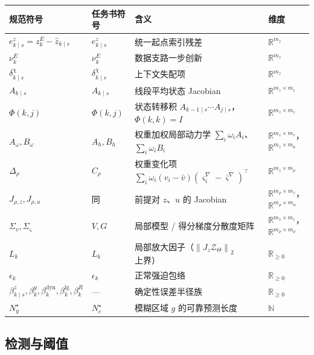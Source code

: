 \documentclass[11pt,a4paper]{ctexart}
\theoremstyle{remark}
\newcommand{\R}{\mathbb{R}}
\newcommand{\norm}[1]{\left\|#1\right\|}
\newcommand{\ZT}{\mathcal{Z}_{\Theta}}
\begin{document}
\begin{longtable}{L{0.28\textwidth}L{0.12\textwidth}L{0.32\textwidth}L{0.16\textwidth}}
\toprule
规范符号 & 任务书符号 & 含义 & 维度 \\
\midrule
\endhead
$e^z_{k\mid s}=z^E_k-\hat z_{k\mid s}$ & $e_{k\mid s}^z$ & 统一起点索引残差 & $\R^{m_z}$ \\
$\nu^E_k$ & $\nu_k^E$ & 数据支路一步创新 & $\R^{m_z}$ \\
$\delta^\chi_{k\mid s}$ & $\delta_{k\mid s}^\chi$ & 上下文失配项 & $\R^{m_z}$ \\
$A_{k\mid s}$ & $A_{k\mid s}$ & 线段平均状态 Jacobian & $\R^{m_z\times m_z}$ \\
$\Phi(k,j)$ & $\Phi(k,j)$ & 状态转移积 $A_{k-1\mid s}\cdots A_{j\mid s}$，$\Phi(k,k)=I$ & $\R^{m_z\times m_z}$ \\
$A_\omega,B_\omega$ & $A_h,B_h$ & 权重加权局部动力学 $\sum_i\omega_iA_i$、$\sum_i\omega_iB_i$ & $\R^{m_z\times m_z}$，$\R^{m_z\times m_u}$ \\
$\Delta_\rho$ & $C_\rho$ & 权重变化项 $\sum_i\omega_i(v_i-\bar v)(\varsigma^\nabla_i-\bar\varsigma^\nabla)^\top$ & $\R^{m_z\times m_\rho}$ \\
$J_{\rho,z},J_{\rho,u}$ & 同 & 前提对 $z$、$u$ 的 Jacobian & $\R^{m_\rho\times m_z}$，$\R^{m_\rho\times m_u}$ \\
$\Sigma_v,\Sigma_\varsigma$ & $V,G$ & 局部模型 / 得分梯度分散度矩阵 & $\R^{m_z\times m_z}$，$\R^{m_\rho\times m_\rho}$ \\
$L_k$ & $L_k$ & 局部放大因子（$\norm{J_z\ZT}_2$ 上界） & $\R_{\ge0}$ \\
$\epsilon_k$ & $\epsilon_k$ & 正常强迫包络 & $\R_{\ge0}$ \\
$\beta^z_{k\mid s},\beta^y_k,\beta^{\mathrm{dyn}}_k,\beta^{\mathrm{lg}}_k,\beta^R_k$ & --- & 确定性误差半径族 & $\R_{\ge0}$ \\
$N^\star_g$ & $N_c^\star$ & 模糊区域 $g$ 的可靠预测长度 & $\mathbb N$ \\
\bottomrule
\end{longtable}

\subsection{检测与阈值}
\end{document}
